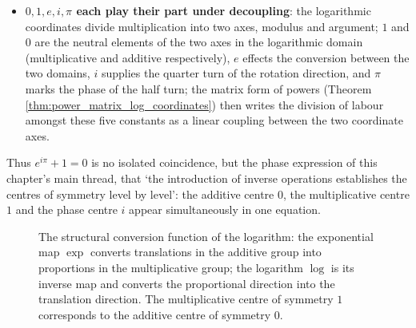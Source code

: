 \begin{remark}[$e^{i\pi}+1=0$: the meeting of five fundamental constants]
\begin{itemize}
    \item \textbf{$0,1,e,i,\pi$ each play their part under decoupling}: the logarithmic coordinates divide multiplication into two axes, modulus and argument; $1$ and $0$ are the neutral elements of the two axes in the logarithmic domain (multiplicative and additive respectively), $e$ effects the conversion between the two domains, $i$ supplies the quarter turn of the rotation direction, and $\pi$ marks the phase of the half turn; the matrix form of powers (Theorem \ref{thm:power_matrix_log_coordinates}) then writes the division of labour amongst these five constants as a linear coupling between the two coordinate axes.
\end{itemize}
Thus $e^{i\pi}+1=0$ is no isolated coincidence, but the phase expression of this chapter's main thread, that `the introduction of inverse operations establishes the centres of symmetry level by level': the additive centre $0$, the multiplicative centre $1$ and the phase centre $i$ appear simultaneously in one equation.
\end{remark}

\begin{figure}[htbp]
\centering
{}
\caption{The structural conversion function of the logarithm: the exponential map $\exp$ converts translations in the additive group into proportions in the multiplicative group; the logarithm $\log$ is its inverse map and converts the proportional direction into the translation direction. The multiplicative centre of symmetry $1$ corresponds to the additive centre of symmetry $0$.}
\label{fig:logarithm_converter}
\end{figure}
